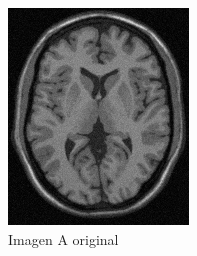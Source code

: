 \documentclass[letterpaper,12pt]{article}
\theoremstyle{plain}
\begin{document}
\begin{figure}[H]
    \centering
         \begin{subfigure}[h]{0.24\linewidth}
            \centering
            \includegraphics[width=\textwidth]{Figuras/ImagenA.png}
            \caption{Imagen A original} 
         \end{subfigure}
         \begin{subfigure}[h]{0.24\linewidth}
            \centering

\end{subfigure}
\end{figure}
\end{document}
